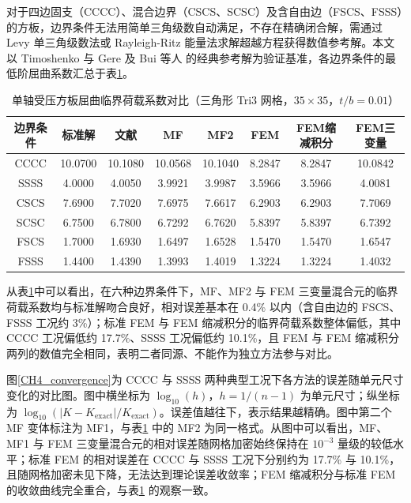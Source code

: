 对于四边固支（CCCC）、混合边界（CSCS、SCSC）及含自由边（FSCS、FSSS）的方板，边界条件无法用简单三角级数自动满足，不存在精确闭合解，需通过 Levy 单三角级数法或 Rayleigh-Ritz 能量法求解超越方程获得数值参考解。本文以 Timoshenko 与 Gere\cite{timoshenko1961} 及 Bui 等人\cite{bui2011} 的经典参考解为验证基准，各边界条件的最低阶屈曲系数汇总于表\ref{CH4_compare_table}。

\begin{table}[H]
\centering
\caption{单轴受压方板屈曲临界荷载系数对比（三角形 Tri3 网格，$35\times35$，$t/b=0.01$）}
\label{CH4_compare_table}
\begin{tabular}{cccccccc}
\hline
边界条件 & 标准解\cite{timoshenko1961} & 文献\cite{bui2011} & MF & MF2 & FEM & FEM缩减积分 & FEM三变量 \\
\hline
CCCC & 10.0700 & 10.1080 & 10.0568 & 10.1040 & 8.2847 & 8.2847 & 10.0842 \\
SSSS & 4.0000 & 4.0050 & 3.9921 & 3.9987 & 3.5966 & 3.5966 & 4.0081 \\
CSCS & 7.6900 & 7.7020 & 7.6975 & 7.6617 & 6.2903 & 6.2903 & 7.7069 \\
SCSC & 6.7500 & 6.7800 & 6.7292 & 6.7620 & 5.8397 & 5.8397 & 6.7392 \\
FSCS & 1.7000 & 1.6930 & 1.6497 & 1.6528 & 1.5470 & 1.5470 & 1.6547 \\
FSSS & 1.4400 & 1.4390 & 1.3993 & 1.4019 & 1.3224 & 1.3224 & 1.4032 \\
\hline
\end{tabular}
\end{table}

从表\ref{CH4_compare_table}中可以看出，在六种边界条件下，MF、MF2 与 FEM 三变量混合元的临界荷载系数均与标准解吻合良好，相对误差基本在 0.4\% 以内（含自由边的 FSCS、FSSS 工况约 3\%）；标准 FEM 与 FEM 缩减积分的临界荷载系数整体偏低，其中 CCCC 工况偏低约 17.7\%、SSSS 工况偏低约 10.1\%，且 FEM 与 FEM 缩减积分两列的数值完全相同，表明二者同源、不能作为独立方法参与对比。

图\ref{CH4_convergence}为 CCCC 与 SSSS 两种典型工况下各方法的误差随单元尺寸变化的对比图。图中横坐标为 $\log_{10}(h)$，$h=1/(n-1)$ 为单元尺寸；纵坐标为 $\log_{10}(|K-K_{\mathrm{exact}}|/K_{\mathrm{exact}})$。误差值越往下，表示结果越精确。图中第二个 MF 变体标注为 MF1，与表\ref{CH4_compare_table} 中的 MF2 为同一格式。从图中可以看出，MF、MF1 与 FEM 三变量混合元的相对误差随网格加密始终保持在 $10^{-3}$ 量级的较低水平；标准 FEM 的相对误差在 CCCC 与 SSSS 工况下分别约为 17.7\% 与 10.1\%，且随网格加密未见下降，无法达到理论误差收敛率；FEM 缩减积分与标准 FEM 的收敛曲线完全重合，与表\ref{CH4_compare_table} 的观察一致。

